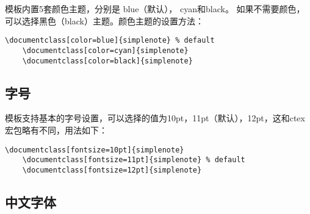 \documentclass[cnfont=NotoCJK]{../simplenote}
\begin{document}
模板内置5套颜色主题，分别是 \textcolor{eblue}{blue}（默认），
\textcolor{ecyan}{cyan}和\textcolor{eblack}{black}。
如果不需要颜色，可以选择黑色（black）主题。颜色主题的设置方法：

\begin{lstlisting}[frame=single]
    \documentclass[color=blue]{simplenote} % default
    \documentclass[color=cyan]{simplenote}
    \documentclass[color=black]{simplenote}
\end{lstlisting}

\subsection{字号}

模板支持基本的字号设置，可以选择的值为10pt，11pt（默认），12pt，这和ctex宏包略有不同，用法如下：
\begin{lstlisting}[frame=single]
    \documentclass[fontsize=10pt]{simplenote}
    \documentclass[fontsize=11pt]{simplenote} % default
    \documentclass[fontsize=12pt]{simplenote}
\end{lstlisting}


\subsection{中文字体}
\end{document}
